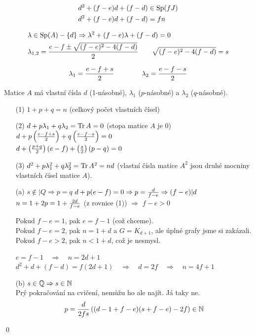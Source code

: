 \begin{align}
	&d^2 + (f-e)d + (f-d) \in \operatorname{Sp}(fJ) \\
	&d^2 + (f-e)d + (f-d) = fn
\end{align}

\begin{align}
	&\lambda \in \operatorname{Sp}(A) - \{d\} \Rightarrow \lambda^2 + (f-e)\lambda + (f-d) = 0 \\
	&\lambda_{1,2} = {e-f \pm \sqrt{(f-e)^2-4(f-d)} \over 2} \qquad \sqrt{(f-e)^2-4(f-d)} = s
\end{align}

$$\lambda_1 = {e-f+s\over 2}\qquad\qquad \lambda_2 = {e-f-s\over 2}$$

Matice $A$ má vlastní čísla $d$ (1-násobné), $\lambda_1$ ($p$-násobné) a
$\lambda_2$ ($q$-násobné).

\begin{enumerate}
	\item[(1)] $1 + p + q = n$ (celkový počet vlastních čísel)

	\item[(2)] $d + p\lambda_1 + q\lambda_2 = \operatorname{Tr} A = 0$ (stopa matice $A$ je 0) \\
	$d + p\left({e-f+s\over 2}\right) + q\left({e-f-s\over 2}\right) = 0$ \\
	$d + \left({p+q\over 2}\right)(e-f) + \left({s\over 2}\right)(p-q) = 0$

	\item[(3)] $d^2 + p\lambda_1^2 + q\lambda_2^2 = \operatorname{Tr} A^2 = nd$ (vlastní čísla matice $A^2$ jsou druhé mocniny vlastních čísel matice $A$).
\end{enumerate}

\begin{enumerate}
	\item[(a)] $s\not\in |Q \Rightarrow p = q$ \quad $d + p(e-f) = 0 \Rightarrow p = {d\over f-e} \Rightarrow (f-e)|d$ \\
	$n = 1 + 2p = 1 + {2d\over f-e}$ \quad (z rovnice (1)) $\Rightarrow$ $f-e > 0$

	Pokud $f-e = 1$, pak $e = f-1$ (což chceme). \\
	Pokud $f-e = 2$, pak $n = 1+d$ a $G = K_{d+1}$, ale úplné grafy jsme si zakázali. \\
	Pokud $f-e > 2$, pak $n < 1+d$, což je nesmysl.

	$e = f-1 \quad\Rightarrow\quad n = 2d+1$ \\
	$d^2 + d + (f-d) = f(2d+1) \quad\Rightarrow\quad d = 2f \quad\Rightarrow\quad n = 4f+1$

	\item[(b)] $s\in\mathbb{Q}\Rightarrow s\in\mathbb{N}$ \\
	\todo Prý pokračování na cvičení, nemůžu ho ale najít. Já taky ne. \\
	$$p = {d\over 2fs}\left((d-1+f-e)(s+f-e)-2f\right) \in \mathbb{N}$$
\end{enumerate}
\qed


